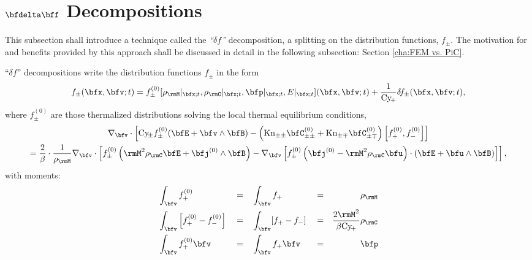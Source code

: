 \section{$\bfdelta\bff$ Decompositions}\label{cha:delta f decompositions}
    This subsection shall introduce a technique called the \emph{``$\delta\!f$''} decomposition, a splitting on the distribution functions, $f_{\pm}$. The motivation for and benefits provided by this approach shall be discussed in detail in the following subsection: Section \ref{cha:FEM vs. PiC}.

    \line

    \begin{definition}\label{def:delta f models}
        ``$\delta\!f$'' decompositions write the distribution functions $f_{\pm}$ in the form
        \begin{equation}
            f_{\pm}(\bfx, \bfv; t)  =  f_{\pm}^{(0)}[\rho_{\rmM}|_{\bfx; t}, \rho_{\rmC}|_{\bfx; t}, \bfp|_{\bfx; t}, E|_{\bfx; t}](\bfx, \bfv; t) + \frac{1}{\rmCy\!_{+}}\delta\!f_{\pm}(\bfx, \bfv; t),
        \end{equation}
        where $f_{\pm}^{(0)}$ are those thermalized distributions solving the local thermal equilibrium conditions,
        \begin{multline}\label{eqn:thermal equilibrium identity}
            \nabla_{\bfv}\cdot\left[\rmCy\!_{\pm}f_{\pm}^{(0)}(\bfE + \bfv\wedge\bfB) - \left(\rmKn_{\pm\pm}\bfC_{\pm\pm}^{(0)} + \rmKn_{\pm\mp}\bfC_{\pm\mp}^{(0)}\right)\left[f_{+}^{(0)}, f_{-}^{(0)}\right]\right]  \\
            =  \frac{2}{\beta}\cdot\frac{1}{\rho_{\rmM}}\nabla_{\bfv}\cdot\left[f_{\pm}^{(0)}\left(\rmM^{2}\rho_{\rmC}\bfE + \bfj^{(0)}\wedge\bfB\right) - \nabla_{\bfv}\left[f_{\pm}^{(0)}\left(\bfj^{(0)} - \rmM^{2}\rho_{\rmC}\bfu\right)\cdot\left(\bfE + \bfu\wedge\bfB\right)\right]\right],
        \end{multline}
        with moments:
        \begin{align}
            &\int_{\bfv}f_{+}^{(0)}                             &  &=  &  &\int_{\bfv}f_{+}                         &  &=  &  &\rho_{\rmM}  \\
            &\int_{\bfv}\left[f_{+}^{(0)} - f_{-}^{(0)}\right]  &  &=  &  &\int_{\bfv}[f_{+} - f_{-}]               &  &=  &  \frac{2\rmM^{2}}{\beta\rmCy\!_{+}}&\rho_{\rmC}  \\
            &\int_{\bfv}f_{+}^{(0)}\bfv                         &  &=  &  &\int_{\bfv}f_{+}\bfv                     &  &=  &  &\bfp  \\

\end{align}
\end{definition}
